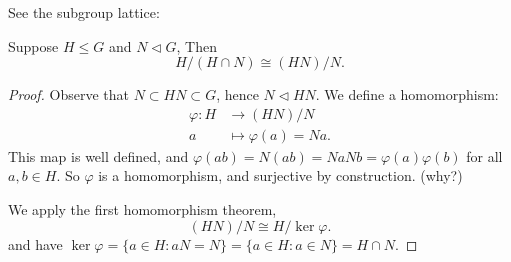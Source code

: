 

See the subgroup lattice:

\begin{theorem}
	Suppose $H \le G$ and $N \triangleleft G$, Then \[
		H / (H \cap N) \cong (H N) / N
	.\] 
\end{theorem}
\begin{proof}
	Observe that $N \subset H N \subset G$, hence $N \triangleleft  H N$. We define a homomorphism:
	\begin{align*}
		\varphi: H &\longrightarrow (H N) / N \\
		a &\longmapsto \varphi(a) = N a
	.\end{align*}
	This map is well defined, and $\varphi(a b) = N(ab) = Na Nb = \varphi(a)\varphi(b)$ for all $a, b \in H$. So $\varphi$ is a homomorphism, and surjective by construction. (why?)

	We apply the first homomorphism theorem, \[
		(H N) /N \cong H / \operatorname{ker} \varphi
	.\] 
	and have $\operatorname{ker} \varphi = \{a \in H: a N = N\} = \{a \in H: a \in N\} = H \cap N$.
\end{proof}


